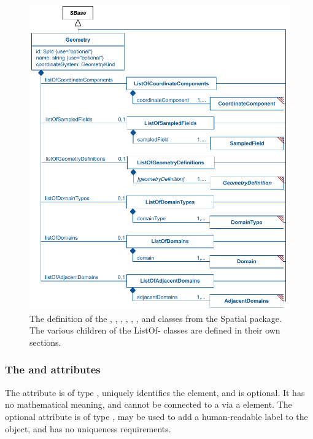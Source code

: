 \begin{figure}[ht]
  \includegraphics{figs/Geometry-uml}
  \caption{The definition of the \Geometry, \ListOfCoordinateComponents, \ListOfDomainTypes, \ListOfDomains, \ListOfAdjacentDomains, \ListOfGeometryDefinitions, and \ListOfSampledFields classes from the Spatial package.  The various children of the ListOf- classes are defined in their own sections.}
  \label{Geometry-uml}
  \label{ListOfCoordinateComponents-uml}
  \label{ListOfDomainTypes-uml}
  \label{ListOfDomains-uml}
  \label{ListOfAdjacentDomains-uml}
  \label{ListOfGeometryDefinitions-uml}
  \label{ListOfSampledFields-uml}
\end{figure}

\subsubsection{The \fixttspace{} and \fixttspace{} attributes}
The  attribute is of type , uniquely identifies the \Geometry element, and is optional.  It has no mathematical meaning, and cannot be connected to a \Parameter via a \SpatialSymbolReference element.  The optional  attribute is of type , may be used to add a human-readable label to the object, and has no uniqueness requirements.

